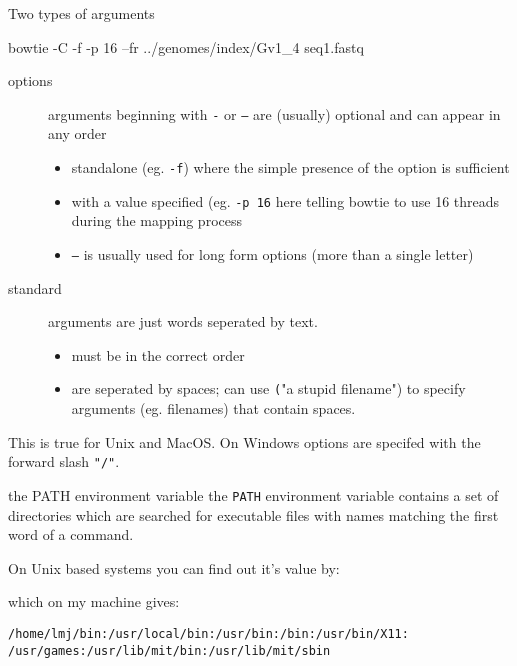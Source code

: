 \documentclass[pdf]{beamer}
\begin{document}
\begin{frame}[fragile]{Two types of arguments}
  \begin{shcode}
    bowtie -C -f -p 16 --fr ../genomes/index/Gv1_4 seq1.fastq
  \end{shcode}
  
  {\small
  \begin{description}
    \item[options] arguments beginning with \texttt{-} or \texttt{--} are
      (usually) optional and can appear in any order
      \begin{itemize}
      \item standalone (eg. \texttt{-f}) where the simple presence
        of the option is sufficient
      \item with a value specified (eg. \texttt{-p 16} here telling bowtie
        to use 16 threads during the mapping process
      \item \texttt{--} is usually used for long form options (more than a
        single letter)
      \end{itemize}
    \item[standard] arguments are just words seperated by text.
      \begin{itemize}
      \item must be in the correct order
      \item are seperated by spaces; can use \texttt("a stupid filename") to
        specify arguments (eg. filenames) that contain spaces.
      \end{itemize}
  \end{description}
 
  This is true for Unix and MacOS. On Windows options are specifed with the
  forward slash \texttt{"/"}.
  }
\end{frame}

\begin{frame}[fragile]{the PATH environment variable}
  the \texttt{PATH} environment variable contains a set of directories which
  are searched for executable files with names matching the first word of a
  command.

  On Unix based systems you can find out it's value by:
  which on my machine gives:
  
  \texttt{/home/lmj/bin:/usr/local/bin:/usr/bin:/bin:/usr/bin/X11:\\/usr/games:/usr/lib/mit/bin:/usr/lib/mit/sbin}
\end{frame}
\end{document}
